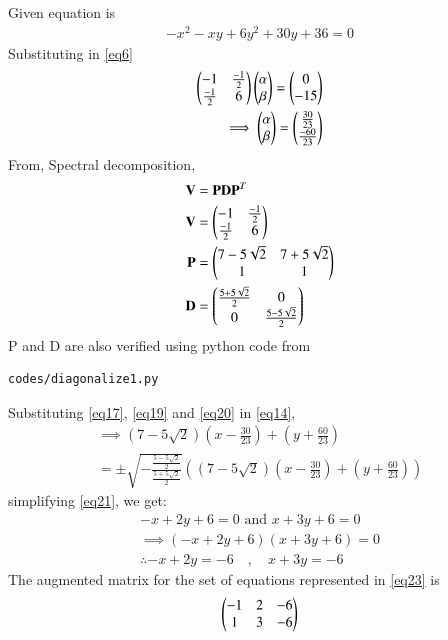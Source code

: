 \documentclass[journal,12pt,twocolumn]{IEEEtran}
\begin{document}
Given equation is
\begin{align}
	-x^2-xy+6y^2+30y+36=0
\end{align}
Substituting in \eqref{eq6}
\begin{align}
	\label{eq16}\begin{pmatrix} -1 & \frac{-1}{2}\\\frac{-1}{2} & 6\end{pmatrix}\begin{pmatrix}\alpha \\ \beta\end{pmatrix} = \begin{pmatrix}0 \\ -15\end{pmatrix} \\
	\label{eq17}\implies \begin{pmatrix}\alpha \\ \beta\end{pmatrix} = \begin{pmatrix}\frac{30}{23} \\ \frac{-60}{23}\end{pmatrix}
\end{align}
From, Spectral decomposition,
\begin{align}
	\mathbf{V} &= \mathbf{P}\mathbf{D}\mathbf{P}^T\\
	\label{eq18}\mathbf{V} &= \begin{pmatrix} -1 & \frac{-1}{2}\\\frac{-1}{2} & 6\end{pmatrix}\\
	\label{eq19}\mathbf{P} &= \begin{pmatrix}7-5 \sqrt{2} & 7+5 \sqrt{2}\\ 1 & 1\end{pmatrix}\\
	\label{eq20}\mathbf{D} &= \begin{pmatrix}\frac{5+5\sqrt{2}}{2} & 0\\ 0 & \frac{5-5\sqrt{2}}{2}\end{pmatrix}
\end{align}
P and D are also verified using python code from
\begin{lstlisting}
codes/diagonalize1.py
\end{lstlisting}
Substituting \eqref{eq17}, \eqref{eq19} and \eqref{eq20} in \eqref{eq14},
\begin{multline}\label{eq21}
\implies	\left(7-5 \sqrt{2}\right)\left(x-\frac{30}{23}\right) + \left(y+\frac{60}{23}\right) \\= \pm \sqrt{-\frac{\frac{5-5\sqrt{2}}{2}}{\frac{5+5\sqrt{2}}{2}}}\left(\left(7-5 \sqrt{2}\right)\left(x-\frac{30}{23}\right) + \left(y+\frac{60}{23}\right)\right)
\end{multline}
simplifying \ref{eq21}, we get:
\begin{align}
	\label{eq22}-x + 2y + 6 = 0 \text{ and } x + 3y + 6 = 0\\
	\implies (-x + 2y + 6)(x + 3y + 6) = 0\\
	\therefore -x+2y=-6 \quad , \quad x+3y=-6\label{eq23}
\end{align}
The augmented matrix for the set of equations represented in \eqref{eq23} is
\begin{align}
\begin{pmatrix}-1&2&-6\\1&3&-6\end{pmatrix}
\end{align}
\end{document}
